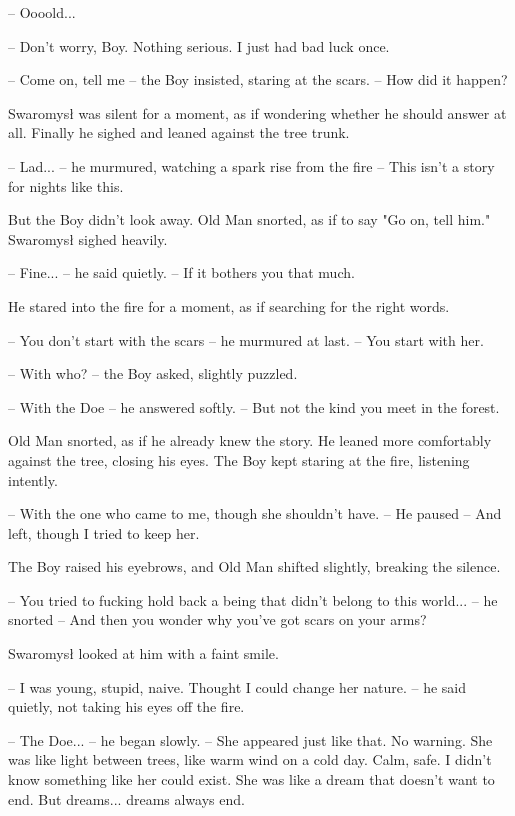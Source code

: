 \par\noindent-- Oooold... 
\par\noindent-- Don't worry, Boy. Nothing serious. I just had bad luck once. 
\par\noindent-- Come on, tell me -- the Boy insisted, staring at the scars. -- How did it happen? 
\par\indent Swaromysł was silent for a moment, as if wondering whether he should answer at all. Finally he sighed and leaned against the tree trunk. 
\par\noindent-- Lad... -- he murmured, watching a spark rise from the fire -- This isn't a story for nights like this. 
\par\indent But the Boy didn't look away. Old Man snorted, as if to say "Go on, tell him." Swaromysł sighed heavily. 
\par\noindent-- Fine... -- he said quietly. -- If it bothers you that much. 
\par\indent He stared into the fire for a moment, as if searching for the right words. 
\par\noindent-- You don't start with the scars -- he murmured at last. -- You start with her. 
\par\noindent-- With who? -- the Boy asked, slightly puzzled. 
\par\noindent-- With the Doe -- he answered softly. -- But not the kind you meet in the forest. 
\par\indent Old Man snorted, as if he already knew the story. He leaned more comfortably against the tree, closing his eyes. The Boy kept staring at the fire, listening intently. 
\par\noindent-- With the one who came to me, though she shouldn't have. -- He paused -- And left, though I tried to keep her. 
\par\indent The Boy raised his eyebrows, and Old Man shifted slightly, breaking the silence. 
\par\noindent-- You tried to fucking hold back a being that didn't belong to this world... -- he snorted -- And then you wonder why you've got scars on your arms? 
\par\indent Swaromysł looked at him with a faint smile. 
\par\noindent-- I was young, stupid, naive. Thought I could change her nature. -- he said quietly, not taking his eyes off the fire. 
\par\noindent-- The Doe... -- he began slowly. -- She appeared just like that. No warning. She was like light between trees, like warm wind on a cold day. Calm, safe. I didn't know something like her could exist. She was like a dream that doesn't want to end. But dreams... dreams always end. 
